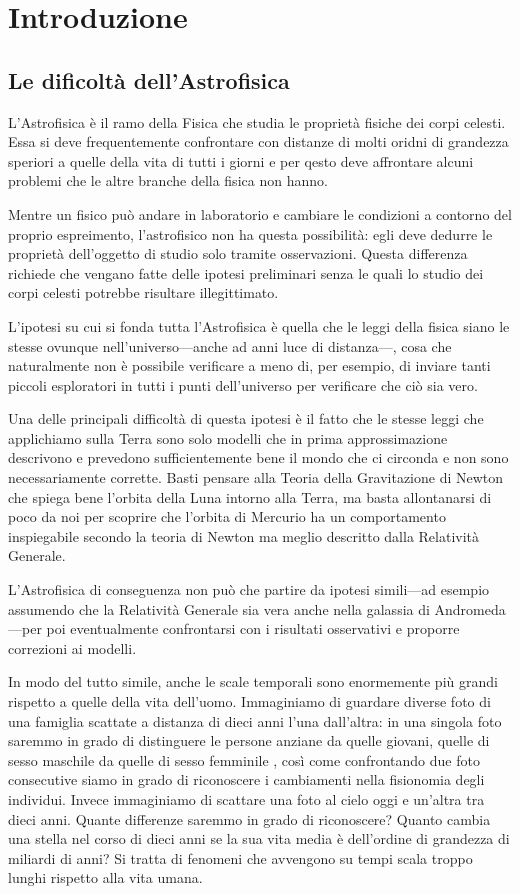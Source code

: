 \chapter{Introduzione}\label{ch:intro}
    \section{Le dificoltà dell'Astrofisica}
        L'Astrofisica è il ramo della Fisica che studia le proprietà fisiche dei corpi celesti. Essa si deve frequentemente confrontare con distanze di molti oridni  di grandezza speriori a quelle della vita di tutti i giorni e per qesto deve affrontare alcuni problemi che le altre branche della fisica non hanno.

        Mentre un fisico può andare in laboratorio e cambiare le condizioni a contorno del proprio espreimento, l'astrofisico non ha questa possibilità: egli deve dedurre le proprietà dell'oggetto di studio solo tramite osservazioni. Questa differenza richiede che vengano fatte delle ipotesi preliminari senza le quali lo studio dei corpi celesti potrebbe risultare illegittimato.
        
        L'ipotesi su cui si fonda tutta l'Astrofisica è quella che le leggi della fisica siano le stesse ovunque nell'universo---anche ad anni luce di distanza---, cosa che naturalmente non è possibile verificare a meno di, per esempio, di inviare tanti piccoli esploratori in tutti i punti dell'universo per verificare che ciò sia vero.

        Una delle principali difficoltà di questa ipotesi è il fatto che le stesse leggi che applichiamo sulla Terra sono solo modelli che in prima approssimazione descrivono e prevedono sufficientemente bene il mondo che ci circonda e non sono necessariamente corrette. Basti pensare alla Teoria della Gravitazione di Newton che spiega bene l'orbita della Luna intorno alla Terra, ma basta allontanarsi di poco da noi per scoprire che l'orbita di Mercurio ha un comportamento inspiegabile secondo la teoria di Newton ma meglio descritto dalla Relatività Generale.

        L'Astrofisica di conseguenza non può che partire da ipotesi simili---ad esempio assumendo che la Relatività Generale sia vera anche nella galassia di Andromeda---per poi eventualmente confrontarsi con i risultati osservativi e proporre correzioni ai modelli.
        
        In modo del tutto simile, anche le scale temporali sono enormemente più grandi rispetto a quelle della vita dell'uomo. Immaginiamo di guardare diverse foto di una famiglia scattate a distanza di dieci anni l'una dall'altra: in una singola foto saremmo in grado di distinguere le persone anziane da quelle giovani, quelle di sesso maschile da quelle di sesso femminile \myetc, così come confrontando due foto consecutive siamo in grado di riconoscere i cambiamenti nella fisionomia degli individui. Invece immaginiamo di scattare una foto al cielo oggi e un'altra tra dieci anni. Quante differenze saremmo in grado di riconoscere? Quanto cambia una stella nel corso di dieci anni se la sua vita media è dell'ordine di grandezza di miliardi di anni? Si tratta di fenomeni che avvengono su tempi scala troppo lunghi rispetto alla vita umana.

